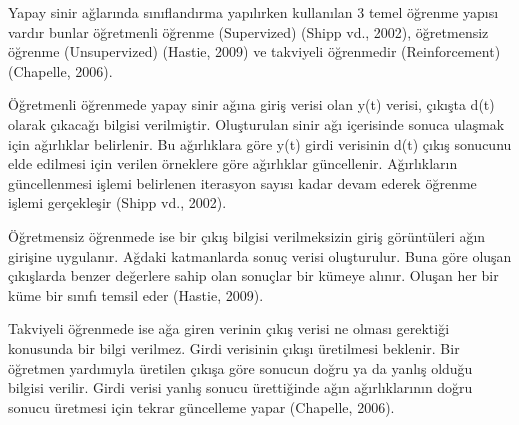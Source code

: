 \documentclass{article}
\begin{document}
\vspace{10pt}
\begin{multicols}{2}
Yapay sinir ağlarında sınıflandırma yapılırken
kullanılan 3 temel öğrenme yapısı vardır bunlar
öğretmenli öğrenme (Supervized) (Shipp vd.,
2002), öğretmensiz öğrenme (Unsupervized)
(Hastie, 2009) ve takviyeli öğrenmedir
(Reinforcement) (Chapelle, 2006).

Öğretmenli öğrenmede yapay sinir ağına giriş
verisi olan y(t) verisi, çıkışta d(t) olarak çıkacağı
bilgisi verilmiştir. Oluşturulan sinir ağı içerisinde
sonuca ulaşmak için ağırlıklar belirlenir. Bu
ağırlıklara göre y(t) girdi verisinin d(t) çıkış
sonucunu elde edilmesi için verilen örneklere
göre ağırlıklar güncellenir. Ağırlıkların
güncellenmesi işlemi belirlenen iterasyon sayısı
kadar devam ederek öğrenme işlemi gerçekleşir
(Shipp vd., 2002). 

Öğretmensiz öğrenmede ise bir çıkış bilgisi
verilmeksizin giriş görüntüleri ağın girişine
uygulanır. Ağdaki katmanlarda sonuç verisi
oluşturulur. Buna göre oluşan çıkışlarda benzer
değerlere sahip olan sonuçlar bir kümeye alınır.
Oluşan her bir küme bir sınıfı temsil eder (Hastie,
2009). 

Takviyeli öğrenmede ise ağa giren verinin çıkış
verisi ne olması gerektiği konusunda bir bilgi
verilmez. Girdi verisinin çıkışı üretilmesi
beklenir. Bir öğretmen yardımıyla üretilen çıkışa
göre sonucun doğru ya da yanlış olduğu bilgisi
verilir. Girdi verisi yanlış sonucu ürettiğinde ağın
ağırlıklarının doğru sonucu üretmesi için tekrar
güncelleme yapar (Chapelle, 2006).
\end{multicols}
\end{document}
